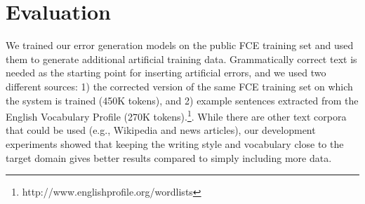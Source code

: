 \documentclass[11pt,letterpaper]{article}
\begin{document}








\section{Evaluation}
\label{sec:evaluation}

We trained our error generation models on the public FCE training set \cite{Yannakoudakis2011} and used them to generate additional artificial training data.
Grammatically correct text is needed as the starting point for inserting artificial errors, and we used two different sources: 1) the corrected version of the same FCE training set on which the system is trained (450K tokens), and 2) example sentences extracted from the English Vocabulary Profile (270K tokens).\footnote{http://www.englishprofile.org/wordlists}. While there are other text corpora that could be used (e.g., Wikipedia and news articles), our development experiments showed that keeping the writing style and vocabulary close to the target domain gives better results compared to simply including more data. 
\end{document}
